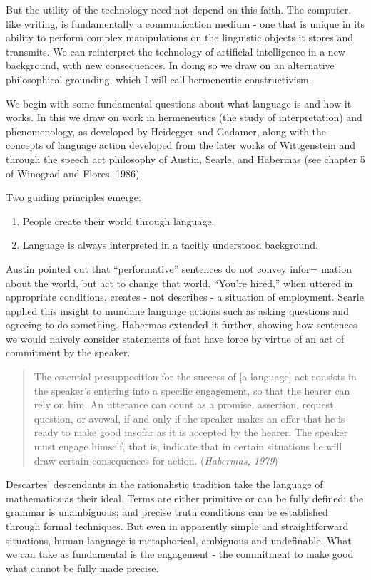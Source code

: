 \documentclass[12pt]{article}
\def\bq{\begin{quote}}
\def\eq{\end{quote}}
\begin{document}
But the utility of the technology need not depend on this faith. The computer, like writing, is fundamentally a communication medium - one that is unique in its ability to perform complex manipulations on the linguistic objects it stores and transmits. We can reinterpret the technology of artificial intelligence in a new background, with new consequences. In doing so we draw on an alternative philosophical grounding, which I will call hermeneutic constructivism.

We begin with some fundamental questions about what language is and how it works. In this we draw on work in hermeneutics (the study of interpretation) and phenomenology, as developed by Heidegger and Gadamer, along with the concepts of language action developed from the later works of Wittgenstein and through the speech act philosophy of Austin, Searle, and Habermas (see chapter 5 of Winograd and Flores, 1986).

Two guiding principles emerge:

\begin{enumerate}
\item People create their world through language.
\item Language is always interpreted in a tacitly understood background.
\end{enumerate}

Austin pointed out that “performative” sentences do not convey infor¬ mation about the world, but act to change that world. “You’re hired,” when uttered in appropriate conditions, creates - not describes - a situation of employment. Searle applied this insight to mundane language actions such as asking questions and agreeing to do something. Habermas extended it further, showing how sentences we would naively consider statements of fact have force by virtue of an act of commitment by the speaker.

\bq
The essential presupposition for the success of [a language] act consists in the speaker’s entering into a specific engagement, so that the hearer can rely on him. An utterance can count as a promise, assertion, request, question, or avowal, if and only if the speaker makes an offer that he is ready to make good insofar as it is accepted by the hearer. The speaker must engage himself, that is, indicate that in certain situations he will draw certain consequences for action. ({\it Habermas, 1979})
\eq

Descartes’ descendants in the rationalistic tradition take the language of mathematics as their ideal. Terms are either primitive or can be fully defined; the grammar is unambiguous; and precise truth conditions can be established through formal techniques. But even in apparently simple and straightforward situations, human language is metaphorical, ambiguous and undefinable. What we can take as fundamental is the engagement - the commitment to make good what cannot be fully made precise.
\end{document}
